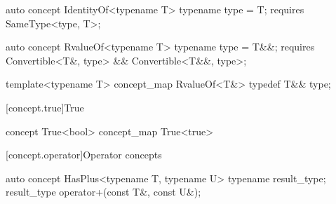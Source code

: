 \documentclass[american,twoside]{book}
\begin{document}
\pnum
{}

\begin{itemdecl}
auto concept IdentityOf<typename T> {
  typename type = T;
  requires SameType<type, T>;
}
\end{itemdecl}

\begin{itemdescr}
\pnum
{} 
\end{itemdescr}

\begin{itemdecl}
auto concept RvalueOf<typename T> {
  typename type = T&&;
  requires Convertible<T&, type> && Convertible<T&&, type>;
}
\end{itemdecl}

\begin{itemdescr}
\pnum
{} 
\end{itemdescr}

\begin{itemdecl}
template<typename T> concept_map RvalueOf<T&> {
  typedef T&& type;
}
\end{itemdecl}

\begin{itemdescr}
\pnum
{}
\end{itemdescr}

[concept.true]{True}

\begin{itemdecl}
concept True<bool> { }
concept_map True<true> { }
\end{itemdecl}

\begin{itemdescr}
\pnum
{}

\pnum
{}
\end{itemdescr}

[concept.operator]{Operator concepts}
\begin{itemdecl}
auto concept HasPlus<typename T, typename U> {
  typename result_type;
  result_type operator+(const T&, const U&);
}
\end{itemdecl}
\end{document}
